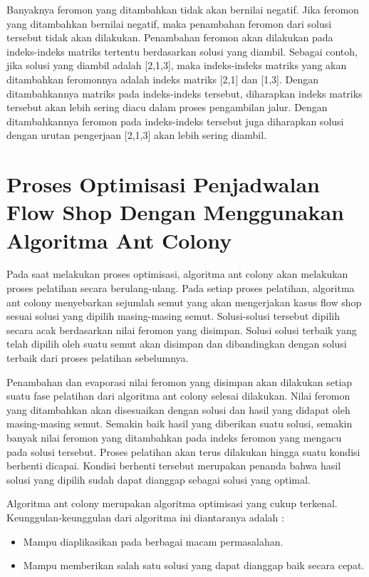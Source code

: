 	Banyaknya feromon yang ditambahkan tidak akan bernilai negatif. Jika feromon yang ditambahkan
	bernilai negatif, maka penambahan feromon dari solusi tersebut tidak akan dilakukan. Penambahan
	feromon akan dilakukan pada indeks-indeks matriks tertentu berdasarkan solusi yang
	diambil. Sebagai contoh, jika solusi yang diambil adalah [2,1,3], maka indeks-indeks matriks yang
	akan ditambahkan feromonnya adalah indeks matriks [2,1] dan [1,3]. Dengan ditambahkannya
	matriks pada indeks-indeks tersebut, diharapkan indeks matriks tersebut akan lebih sering diacu
	dalam proses pengambilan jalur. Dengan ditambahkannya feromon pada indeks-indeks tersebut
	juga diharapkan solusi dengan urutan pengerjaan [2,1,3] akan lebih sering diambil.



\section{Proses Optimisasi Penjadwalan Flow Shop Dengan Menggunakan Algoritma Ant Colony}

	Pada saat melakukan proses optimisasi, algoritma ant colony akan melakukan proses pelatihan
	secara berulang-ulang. Pada setiap proses pelatihan, algoritma ant colony menyebarkan sejumlah
	semut yang akan mengerjakan kasus flow shop sesuai solusi yang dipilih masing-masing
	semut. Solusi-solusi tersebut dipilih secara acak berdasarkan nilai feromon yang disimpan. Solusi solusi
	terbaik yang telah dipilih oleh suatu semut akan disimpan dan dibandingkan dengan solusi
	terbaik dari proses pelatihan sebelumnya.
	
	Penambahan dan evaporasi nilai feromon yang disimpan akan dilakukan setiap suatu fase pelatihan
	dari algoritma ant colony selesai dilakukan. Nilai feromon yang ditambahkan akan disesuaikan
	dengan solusi dan hasil yang didapat oleh masing-masing semut. Semakin baik hasil yang diberikan
	suatu solusi, semakin banyak nilai feromon yang ditambahkan pada indeks feromon yang mengacu
	pada solusi tersebut. Proses pelatihan akan terus dilakukan hingga suatu kondisi berhenti dicapai.
	Kondisi berhenti tersebut merupakan penanda bahwa hasil solusi yang dipilih sudah dapat dianggap
	sebagai solusi yang optimal.
	
	Algoritma ant colony merupakan algoritma optimisasi yang cukup terkenal. Keunggulan-keunggulan
	dari algoritma ini diantaranya adalah :
	\begin{itemize}
		\item Mampu diaplikasikan pada berbagai macam permasalahan.
		\item Mampu memberikan salah satu solusi yang dapat dianggap baik secara cepat.
	\end{itemize}

